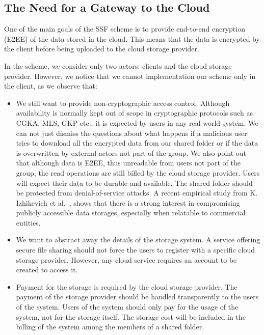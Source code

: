 \subsection{The Need for a Gateway to the Cloud}\label{sc:cloud-storage-access-and-billing}
One of the main goals of the SSF scheme is to provide
end-to-end encryption (E2EE) of the data stored in the cloud.
This means that the data is encrypted by the client before
being uploaded to the cloud storage provider.

In the scheme, we consider only two actors:
clients and the cloud storage provider.
However, we notice that we cannot implementation
our scheme only in the client, as we observe that:
\begin{itemize}
    \item We still want to provide non-cryptographic access control. 
    Although availability is normally kept out of scope in cryptographic 
    protocols such as CGKA, MLS, GKP etc., it is expected by users
    in any real-world system. We can not just dismiss the questions about
    what happens if a malicious user tries to download all the encrypted
    data from our shared folder or if the data is overwritten by external
    actors not part of the group. We also point out that although 
    data is E2EE, thus unreadable from users not part of the group,
    the read operations are still billed by the cloud storage provider.
    Users will expect their data to be durable
    and available. The shared folder should be protected from
    denial-of-service attacks. 
    A recent empirical study from K. Izhikevich et al.~\cite{izhikevich2023using},
    shows that there is a strong interest
    in compromising publicly accessible data storages,
    especially when relatable to commercial entities.
    \item We want to abstract away the details of the storage system.
    A service offering secure file sharing should not force the users
    to register with a specific cloud storage provider. However,
    any cloud service requires an account to be created to access it.
    \item Payment for the storage is required by the cloud storage provider.
    The payment of the storage provider should be handled transparently to the users of the system. Users of the system should only pay
    for the usage of the system, not for the storage itself. The storage
    cost will be included in the billing of the system among the members
    of a shared folder.
\end{itemize} 

